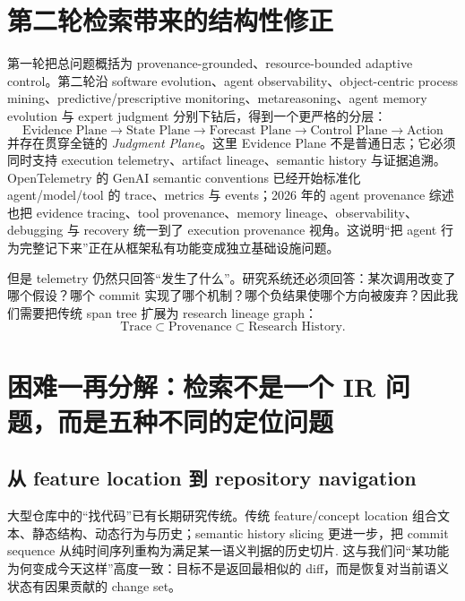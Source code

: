 \documentclass[11pt,a4paper]{ctexart}
\begin{document}
\section{第二轮检索带来的结构性修正}

第一轮把总问题概括为 provenance-grounded、resource-bounded adaptive control。第二轮沿 software evolution、agent observability、object-centric process mining、predictive/prescriptive monitoring、metareasoning、agent memory evolution 与 expert judgment 分别下钻后，得到一个更严格的分层：
\begin{equation}
\boxed{
\text{Evidence Plane}
\to \text{State Plane}
\to \text{Forecast Plane}
\to \text{Control Plane}
\to \text{Action}
}
\end{equation}
并存在贯穿全链的 \emph{Judgment Plane}。这里 Evidence Plane 不是普通日志；它必须同时支持 execution telemetry、artifact lineage、semantic history 与证据追溯。OpenTelemetry 的 GenAI semantic conventions 已经开始标准化 agent/model/tool 的 trace、metrics 与 events；2026 年的 agent provenance 综述也把 evidence tracing、tool provenance、memory lineage、observability、debugging 与 recovery 统一到了 execution provenance 视角\cite{otel2026genai,wang2026provenance}。这说明“把 agent 行为完整记下来”正在从框架私有功能变成独立基础设施问题。

但是 telemetry 仍然只回答“发生了什么”。研究系统还必须回答：某次调用改变了哪个假设？哪个 commit 实现了哪个机制？哪个负结果使哪个方向被废弃？因此我们需要把传统 span tree 扩展为 research lineage graph：
\begin{equation}
\boxed{
\text{Trace} \subset \text{Provenance} \subset \text{Research History}.
}
\end{equation}

\section{困难一再分解：检索不是一个 IR 问题，而是五种不同的定位问题}

\subsection{从 feature location 到 repository navigation}

大型仓库中的“找代码”已有长期研究传统。传统 feature/concept location 组合文本、静态结构、动态行为与历史；semantic history slicing 更进一步，把 commit sequence 从纯时间序列重构为满足某一语义判据的历史切片\cite{li2018semantic}. 这与我们问“某功能为何变成今天这样”高度一致：目标不是返回最相似的 diff，而是恢复对当前语义状态有因果贡献的 change set。
\end{document}
